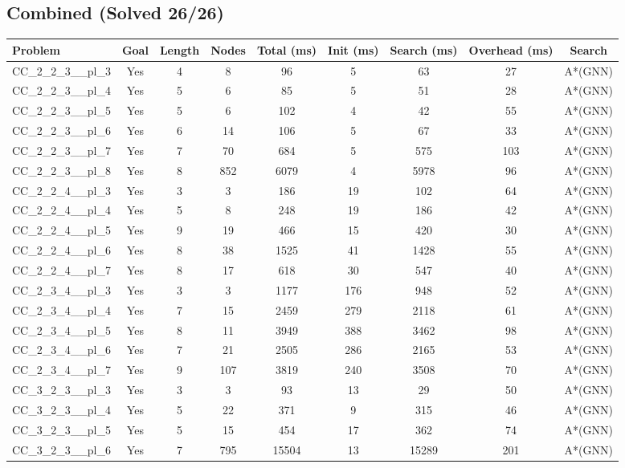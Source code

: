 \documentclass{article}
\begin{document}
\subsection*{Combined (Solved 26/26)}
\begin{tabular}{lcccccccc}
\toprule
Problem & Goal & Length & Nodes & Total (ms) & Init (ms) & Search (ms) & Overhead (ms) & Search \\
\midrule
CC\_2\_2\_3\_\_pl\_3 & Yes & 4 & 8 & 96 & 5 & 63 & 27 & A*(GNN) \\
CC\_2\_2\_3\_\_pl\_4 & Yes & 5 & 6 & 85 & 5 & 51 & 28 & A*(GNN) \\
CC\_2\_2\_3\_\_pl\_5 & Yes & 5 & 6 & 102 & 4 & 42 & 55 & A*(GNN) \\
CC\_2\_2\_3\_\_pl\_6 & Yes & 6 & 14 & 106 & 5 & 67 & 33 & A*(GNN) \\
CC\_2\_2\_3\_\_pl\_7 & Yes & 7 & 70 & 684 & 5 & 575 & 103 & A*(GNN) \\
CC\_2\_2\_3\_\_pl\_8 & Yes & 8 & 852 & 6079 & 4 & 5978 & 96 & A*(GNN) \\
CC\_2\_2\_4\_\_pl\_3 & Yes & 3 & 3 & 186 & 19 & 102 & 64 & A*(GNN) \\
CC\_2\_2\_4\_\_pl\_4 & Yes & 5 & 8 & 248 & 19 & 186 & 42 & A*(GNN) \\
CC\_2\_2\_4\_\_pl\_5 & Yes & 9 & 19 & 466 & 15 & 420 & 30 & A*(GNN) \\
CC\_2\_2\_4\_\_pl\_6 & Yes & 8 & 38 & 1525 & 41 & 1428 & 55 & A*(GNN) \\
CC\_2\_2\_4\_\_pl\_7 & Yes & 8 & 17 & 618 & 30 & 547 & 40 & A*(GNN) \\
CC\_2\_3\_4\_\_pl\_3 & Yes & 3 & 3 & 1177 & 176 & 948 & 52 & A*(GNN) \\
CC\_2\_3\_4\_\_pl\_4 & Yes & 7 & 15 & 2459 & 279 & 2118 & 61 & A*(GNN) \\
CC\_2\_3\_4\_\_pl\_5 & Yes & 8 & 11 & 3949 & 388 & 3462 & 98 & A*(GNN) \\
CC\_2\_3\_4\_\_pl\_6 & Yes & 7 & 21 & 2505 & 286 & 2165 & 53 & A*(GNN) \\
CC\_2\_3\_4\_\_pl\_7 & Yes & 9 & 107 & 3819 & 240 & 3508 & 70 & A*(GNN) \\
CC\_3\_2\_3\_\_pl\_3 & Yes & 3 & 3 & 93 & 13 & 29 & 50 & A*(GNN) \\
CC\_3\_2\_3\_\_pl\_4 & Yes & 5 & 22 & 371 & 9 & 315 & 46 & A*(GNN) \\
CC\_3\_2\_3\_\_pl\_5 & Yes & 5 & 15 & 454 & 17 & 362 & 74 & A*(GNN) \\
CC\_3\_2\_3\_\_pl\_6 & Yes & 7 & 795 & 15504 & 13 & 15289 & 201 & A*(GNN) \\

\end{tabular}
\end{document}
